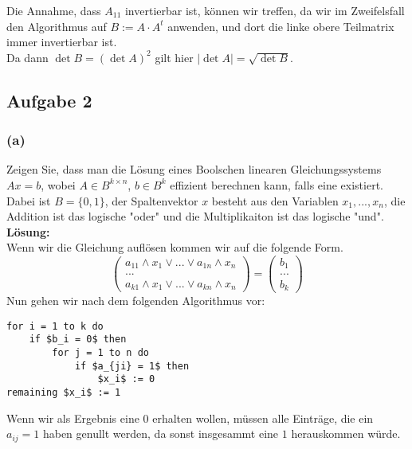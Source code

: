 \documentclass[11pt,a4paper,ngerman]{article}
\begin{document}
Die Annahme, dass $A_{11}$ invertierbar ist, können wir treffen, da wir im Zweifelsfall den Algorithmus
auf $B := A\cdot A^{t}$ anwenden, und dort die linke obere Teilmatrix immer invertierbar ist. \\
Da dann $\det B = (\det A)^2$ gilt hier $|\det A| = \sqrt{\det B}$.


\subsection*{Aufgabe 2}

\subsubsection*{(a)}
Zeigen Sie, dass man die Lösung eines Boolschen linearen Gleichungssystems $Ax = b$, wobei $A \in B^{k \times n}$, $b \in B^k$ effizient berechnen
kann, falls eine existiert. Dabei ist $B = \{ 0 , 1 \}$, der Spaltenvektor $x$ besteht aus den Variablen $x_1, ..., x_n$, die Addition
ist das logische "oder" und die Multiplikaiton ist das logische "und".\\

\textbf{Lösung:}\\

Wenn wir die Gleichung auflösen kommen wir auf die folgende Form.
\begin{equation*}
\left( \begin{array}{c} a_{11}\land x_1 \lor ... \lor a_{1n} \land x_n\\ ... \\ a_{k1}\land x_1 \lor ... \lor a_{kn}\land x_n\end{array}\right) 
    = \left( \begin{array}{c} b_1 \\ ... \\ b_k \end{array} \right)
\end{equation*}
Nun gehen wir nach dem folgenden Algorithmus vor:
\begin{lstlisting}
for i = 1 to k do
    if $b_i = 0$ then
        for j = 1 to n do
            if $a_{ji} = 1$ then
                $x_i$ := 0
remaining $x_i$ := 1
\end{lstlisting}
Wenn wir als Ergebnis eine $0$ erhalten wollen, müssen alle Einträge, die ein $a_{ij} = 1$ haben genullt werden, da sonst insgesammt eine $1$ herauskommen würde.\\
\end{document}
